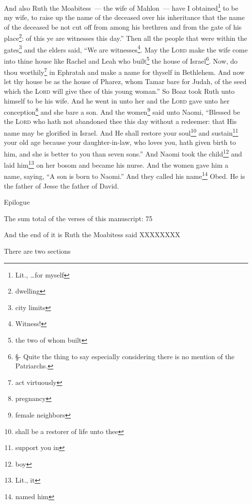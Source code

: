 \begin{enumerate*}[mode=unboxed]
     And also Ruth the Moabitess~--- the wife of Mahlon~--- have I obtained\footnote{Lit., \dots for myself} to be my wife, to raise up the name of the deceased over his inheritance that the name of the deceased be not cut off from among his brethren and from the gate of his place\footnote{dwelling}: of this ye are witnesses this day.''%
     Then all the people that were within the gates\footnote{city limits} and the elders said, ``We are witnesses\footnote{Witness!}. May the \textsc{Lord} make the wife come into thine house like Rachel and Leah who built\footnote{the two of whom built} the house of Israel\footnote{\S - Quite the thing to say especially considering there is no mention of the Patriarchs.}. Now, do thou worthily\footnote{act virtuously} in Ephratah and make a name for thyself in Bethlehem.%
     And now let thy house be as the house of Pharez, whom Tamar bare for Judah, of the seed which the \textsc{Lord} will give thee of this young woman.''%
     So Boaz took Ruth unto himself to be his wife. And he went in unto her and the \textsc{Lord} gave unto her conception\footnote{pregnancy} and she bare a son.%
     And the women\footnote{female neighbors} said unto Naomi, ``Blessed be the \textsc{Lord} who hath not abandoned thee this day without a redeemer: that His name may be glorified in Israel.%
     And He shall restore your soul\footnote{shall be a restorer of life unto thee} and sustain\footnote{support you in} your old age because your daughter-in-law, who loves you, hath given birth to him, and she is better to you than seven sons.''%
     And Naomi took the child\footnote{boy} and laid him\footnote{Lit., it} on her bosom and became his nurse.%
     And the women gave him a name, saying, ``A son is born to Naomi.'' And they called his name\footnote{named him} Obed. He is the father of Jesse the father of David.%
\end{enumerate*}

Epilogue

The sum total of the verses of this manuscript: 75

And the end of it is Ruth the Moabitess said XXXXXXXX

There are two sections
